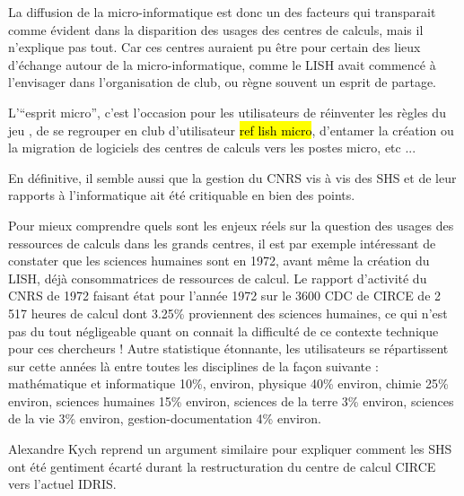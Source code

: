 La diffusion de la micro-informatique est donc un des facteurs qui transparait comme évident dans la disparition des usages des centres de calculs, mais il n'explique pas tout. Car ces centres auraient pu être pour certain des lieux d'échange autour de la micro-informatique, comme le LISH avait commencé à l'envisager dans l'organisation de club, ou règne souvent un esprit de partage.

L'\enquote{esprit micro}, c'est l'occasion pour les utilisateurs de réinventer les règles du jeu , de se regrouper en club d'utilisateur \hl{ref lish micro}, d'entamer la création ou la migration de logiciels des centres de calculs vers les postes micro, etc ...

En définitive, il semble aussi que la gestion du CNRS vis à vis des SHS et de leur rapports à l'informatique ait été critiquable en bien des points.

Pour mieux comprendre quels sont les enjeux réels sur la question des usages des ressources de calculs dans les grands centres, il est par exemple intéressant de constater que les sciences humaines sont en 1972, avant même la création du LISH, déjà consommatrices de ressources de calcul. Le rapport d’activité du CNRS de 1972 faisant état pour l’année 1972 sur le 3600 CDC de CIRCE de 2 517 heures de calcul dont 3.25\% proviennent des sciences humaines, ce qui n’est pas du tout négligeable quant on connait la difficulté de ce contexte technique pour ces chercheurs ! Autre statistique étonnante, les utilisateurs se répartissent sur cette années là entre toutes les disciplines  de la façon suivante : mathématique et informatique 10\%, environ, physique 40\% environ, chimie 25\% environ, sciences humaines 15\% environ, sciences de la terre 3\% environ, sciences de la vie 3\% environ, gestion-documentation 4\% environ.

Alexandre Kych reprend un argument similaire pour expliquer comment les SHS ont été gentiment écarté durant la restructuration du centre de calcul CIRCE vers l'actuel IDRIS.

